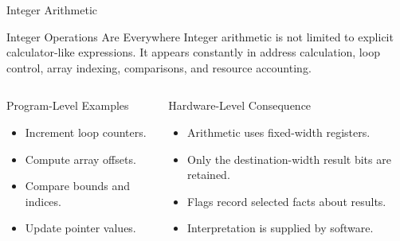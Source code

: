 \documentclass[aspectratio=169,11pt,t]{beamer}
\begin{document}
\begin{frame}{Integer Arithmetic}
\begin{block}{Integer Operations Are Everywhere}
Integer arithmetic is not limited to explicit calculator-like expressions. It appears constantly in address calculation, loop control, array indexing, comparisons, and resource accounting.
\end{block}
\vspace{0.25cm}
\begin{columns}[T,onlytextwidth]
\begin{block}{Program-Level Examples}
\begin{itemize}
\item Increment loop counters.
\item Compute array offsets.
\item Compare bounds and indices.
\item Update pointer values.
\end{itemize}
\end{block}
\begin{block}{Hardware-Level Consequence}
\begin{itemize}
\item Arithmetic uses fixed-width registers.
\item Only the destination-width result bits are retained.
\item Flags record selected facts about results.
\item Interpretation is supplied by software.
\end{itemize}
\end{block}
\end{columns}
\end{frame}



\end{document}
